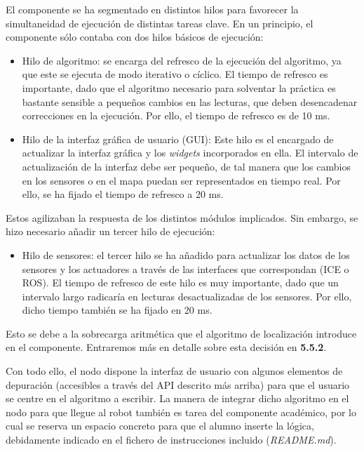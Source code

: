El componente se ha segmentado en distintos hilos para favorecer la simultaneidad de ejecución de distintas tareas clave. En un principio, el componente sólo contaba con dos hilos básicos de ejecución:

\begin{itemize}
  \renewcommand{\labelitemi}{$\to$}
	\item Hilo de algoritmo: se encarga del refresco de la ejecución del algoritmo, ya que este se ejecuta de modo iterativo o cíclico. El tiempo de refresco es importante, dado que el algoritmo necesario para solventar la práctica es bastante sensible a pequeños cambios en las lecturas, que deben desencadenar correcciones en la ejecución. Por ello, el tiempo de refresco es de 10 ms.
	\item Hilo de la interfaz gráfica de usuario (GUI): Este hilo es el encargado de actualizar la interfaz gráfica y los \textit{widgets} incorporados en ella. El intervalo de actualización de la interfaz debe ser pequeño, de tal manera que los cambios en los sensores o en el mapa puedan ser representados en tiempo real. Por ello, se ha fijado el tiempo de refresco a 20 ms.
\end{itemize}

Estos agilizaban la respuesta de los distintos módulos implicados. Sin embargo, se hizo necesario añadir un tercer hilo de ejecución:

\begin{itemize}
  \renewcommand{\labelitemi}{$\to$}
	\item Hilo de sensores: el tercer hilo se ha añadido para actualizar los datos de los sensores y los actuadores a través de las interfaces que correspondan (ICE o ROS). El tiempo de refresco de este hilo es muy importante, dado que un intervalo largo radicaría en lecturas desactualizadas de los sensores. Por ello, dicho tiempo también se ha fijado en 20 ms.
\end{itemize}

Esto se debe a la sobrecarga aritmética que el algoritmo de localización introduce en el componente. Entraremos más en detalle sobre esta decisión en \textbf{5.5.2}.

Con todo ello, el nodo dispone la interfaz de usuario con algunos elementos de depuración (accesibles a través del API descrito más arriba) para que el usuario se centre en el algoritmo a escribir. La manera de integrar dicho algoritmo en el nodo para que llegue al robot también es tarea del componente académico, por lo cual se reserva un espacio concreto para que el alumno inserte la lógica, debidamente indicado en el fichero de instrucciones incluido (\textit{README.md}).

